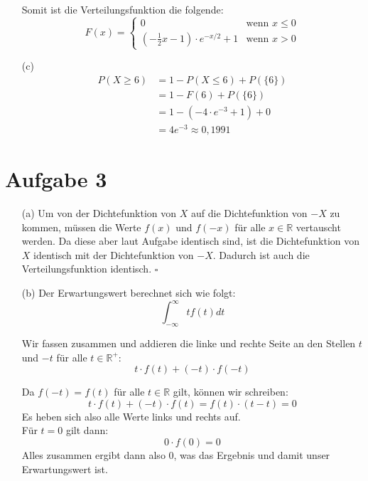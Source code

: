 \documentclass[10pt,a4paper]{article}
\begin{document}
\begin{itemize}
Somit ist die Verteilungsfunktion die folgende:
\begin{equation*}
F(x) =
\left\{
	\begin{array}{ll}
		0  & \mbox{wenn } x \leq 0 \\
		\left( -\frac{1}{2}x - 1\right) \cdot e^{-x/2} + 1 & \mbox{wenn } x > 0
	\end{array}
\right.
\end{equation*}

\item[(c)]
\begin{align*}
P(X \geq 6) &= 1 - P(X \leq 6) + P(\{6\})\\
&= 1 - F(6) + P(\{6\})\\
&= 1 - (-4 \cdot e^{-3} +1) + 0\\
&= 4 e^{-3} \approx 0,1991
\end{align*}
\end{itemize}

\section*{Aufgabe 3}
\begin{itemize}
\item[(a)]
Um von der Dichtefunktion von $X$ auf die Dichtefunktion von $-X$ zu kommen, müssen die Werte $f(x)$ und $f(-x)$ für alle $x \in \mathbb{R}$ vertauscht werden. Da diese aber laut Aufgabe identisch sind, ist die Dichtefunktion von $X$ identisch mit der Dichtefunktion von $-X$. Dadurch ist auch die Verteilungsfunktion identisch. $\square$

\item[(b)]
Der Erwartungswert berechnet sich wie folgt:
$$\int_{-\infty}^{\infty} tf(t) dt$$

Wir fassen zusammen und addieren die linke und rechte Seite an den Stellen $t$ und $-t$ für alle $t \in \mathbb{R}^+$:
$$t \cdot f(t) + (-t) \cdot f(-t)$$

Da $f(-t) = f(t)$ für alle $t \in \mathbb{R}$ gilt, können wir schreiben:
$$t \cdot f(t) + (-t) \cdot f(t) = f(t) \cdot (t-t) = 0$$
Es heben sich also alle Werte links und rechts auf.\\
Für $t=0$ gilt dann:
$$0 \cdot f(0) = 0$$
Alles zusammen ergibt dann also $0$, was das Ergebnis und damit unser Erwartungswert ist.

\end{itemize}
\end{document}
